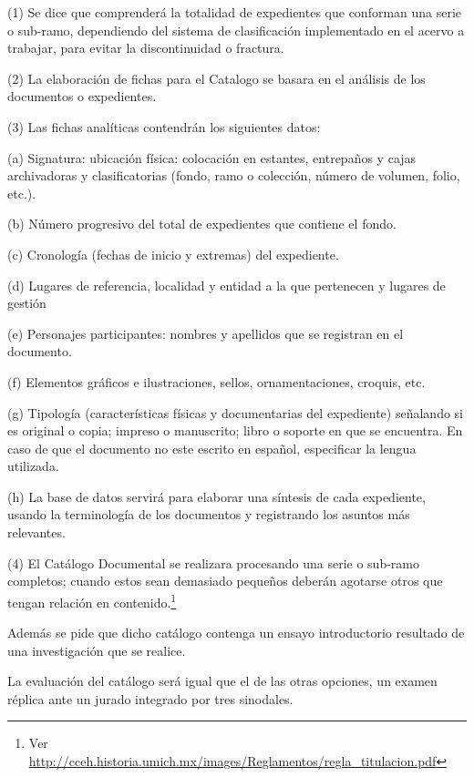 \enlargethispage{1\baselineskip}
\begin{Obs}
\item[(1)] Se dice que comprenderá la totalidad de expedientes que conforman 
una serie o sub-ramo, dependiendo del sistema de clasificación 
implementado en el acervo a trabajar, para evitar la discontinuidad o 
fractura.
\item[(2)] La elaboración de fichas para el Catalogo se basara en el análisis 
de los documentos o expedientes.
\item[(3)] Las fichas  analíticas contendrán los siguientes datos:
\item[(a)] Signatura: ubicación física: colocación en estantes, entrepaños y cajas
archivadoras y clasificatorias (fondo, ramo o colección, número de volumen, 
folio, etc.).
\item[(b)] Número progresivo del total de expedientes que contiene el fondo.
\item[(c)]  Cronología (fechas de inicio y extremas) del expediente.
\item[(d)] Lugares de referencia, localidad y entidad a la que pertenecen y 
lugares de gestión
\item[(e)] Personajes participantes: nombres y apellidos que se registran en el 
documento.
\item[(f)] Elementos gráficos e ilustraciones, sellos, ornamentaciones, 
croquis, etc.
\item[(g)] Tipología (características físicas y documentarias del expediente) 
señalando si es original o copia; impreso o manuscrito; libro o soporte 
en que se encuentra. En caso de que el documento no este escrito en 
español, especificar la lengua utilizada.
\item[(h)] La base de datos servirá para elaborar una síntesis de cada 
expediente, usando la terminología de los documentos y registrando los 
asuntos más relevantes.
\item[(4)] El Catálogo Documental se realizara procesando una serie o sub-ramo
completos; cuando estos sean demasiado pequeños
deberán agotarse otros que tengan relación en
contenido.\footnote{Ver \url{http://cceh.historia.umich.mx/images/Reglamentos/regla_titulacion.pdf}}
\end{Obs}


Además se pide que dicho catálogo contenga un ensayo introductorio 
resultado de una investigación que se realice.

La evaluación del catálogo será igual que el de las otras opciones, un 
examen réplica ante un jurado integrado por tres sinodales.

